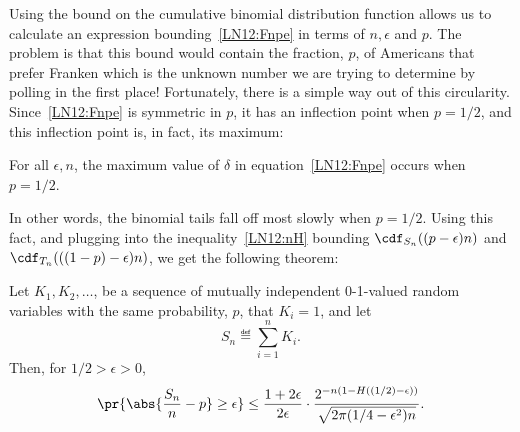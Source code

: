 Using the bound on the cumulative binomial distribution function allows us
to calculate an expression bounding~\eqref{LN12:Fnpe} in terms of $n, \epsilon$
and $p$.  The problem is that this bound would contain the fraction, $p$,
of Americans that prefer Franken which is the unknown number we are trying
to determine by polling in the first place!  Fortunately, there is a
simple way out of this circularity.  Since~\eqref{LN12:Fnpe} is symmetric in
$p$, it has an inflection point when $p=1/2$, and this inflection point
is, in fact, its maximum:
\begin{fact*}
For all $\epsilon,n$, the maximum value of $\delta$ in
equation~\eqref{LN12:Fnpe} occurs when $p = 1/2$.
\end{fact*}
In other words, the binomial tails fall off most slowly when $p=1/2$.
Using this fact, and plugging into the inequality~\eqref{LN12:nH} bounding
$\cdf_{S_n}((p - \epsilon) n)$ and $\cdf_{T_n}(((1-p) - \epsilon) n)$, we
get the following theorem:

\iffalse
So, letting $\alpha = (1/2) - \epsilon$, we have
\begin{align*}
\delta & \leq F_{n,1/2}((\frac{1}{2} - \epsilon) n) +
   F_{n,1 - 1/2}((1 -\frac{1}{2}-\epsilon) n)\notag\\
   & = 2 F_{n,1/2}(\alpha n)\notag\\
 & \le 2 \cdot \frac{\beta}{1 - \alpha / (1/2)} \cdot
                \frac{2^{n H(\alpha)}}{\sqrt{2 \pi \alpha \beta  n}} 
                \cdot (1/2)^{\alpha n} (1/2)^{\beta n}
   &\text{(by~\eqref{LN12:1 - H} and~\eqref{LN12:Fbyf})}\notag\\
 & =  2 \cdot \frac{\beta}{1 - 2\alpha} \cdot
                \frac{2^{n H(\alpha)}}{\sqrt{2 \pi \alpha \beta  n}}
                \cdot (1/2)^n\notag\\
 & = 2 \cdot \frac{\beta}{1 - 2\alpha} \cdot
                \frac{2^{-n (1 - H(\alpha))}}{\sqrt{2 \pi \alpha \beta n}}\\
 & = \frac{1 - 2\epsilon}{2\epsilon} \cdot
     \frac{2^{-n (1 - H((1/2) - \epsilon))}}{\sqrt{2 \pi (1/4 - \epsilon^2) n}}.
\end{align*}

To summarize, we have established
\fi
\begin{theorem}\label{LN12:bs}
Let $K_1, K_2, \dots$, be a sequence of mutually independent 0-1-valued
random variables with the same probability, $p$, that $K_i=1$, and let
\[
S_n \eqdef \sum_{i=1}^n K_i.
\]
Then, for $1/2 > \epsilon > 0$,
\begin{equation}\label{LN12:delta bound}
\pr{\abs{\frac{S_n}{n} - p} \geq \epsilon}
\leq 
\frac{1 + 2\epsilon}{2\epsilon} \cdot
        \frac{2^{-n (1 - H((1/2) - \epsilon))}}{\sqrt{2 \pi (1/4 - \epsilon^2) n}}.
\end{equation}

\end{theorem}

